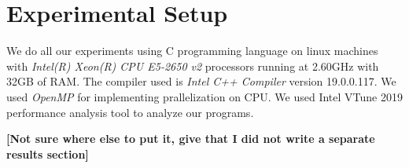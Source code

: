 \documentclass[master]{thesis}
\begin{document}
\chapter{Experimental Setup}
\label{appendix:setup}
We do all our experiments using C programming language on linux machines with \textit{Intel(R) Xeon(R) CPU E5-2650 v2} processors running at 2.60GHz with 32GB of RAM. The compiler used is \textit{Intel C++ Compiler} version 19.0.0.117. We used \textit{OpenMP } for implementing  prallelization on CPU. We used Intel VTune 2019 performance analysis tool to analyze our programs.

\textbf{[Not sure where else to put it, give that I did not write a separate results section]}


\end{document}
